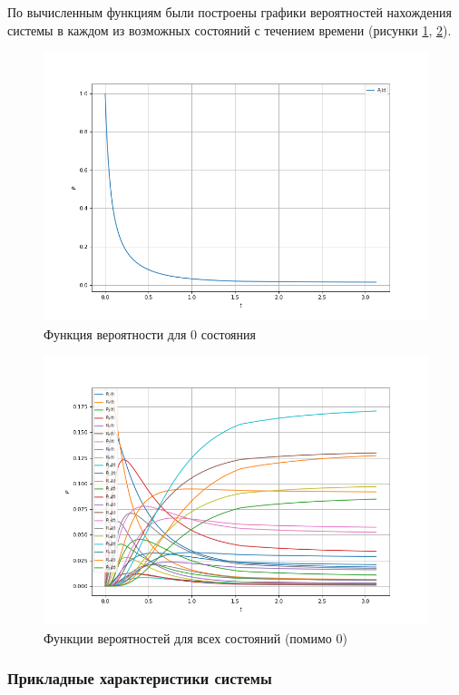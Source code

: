 По вычисленным функциям были построены графики вероятностей нахождения системы в каждом из возможных состояний с течением времени
(рисунки \ref{P_o}, \ref{P_i}).
\begin{figure}[H]
\centerline{\includegraphics[width=\textwidth]{Images/P_o.png}}
\caption{Функция вероятности для 0 состояния}
\label{P_o}
\end{figure}

\begin{figure}[H]
\centerline{\includegraphics[width=\textwidth]{Images/P_i.png}}
\caption{Функции вероятностей для всех состояний (помимо 0) }
\label{P_i}
\end{figure}

\subsubsection{Прикладные характеристики системы}

